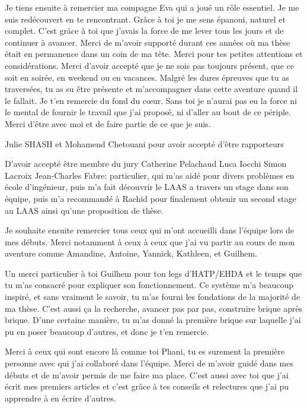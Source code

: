 
Je tiens ensuite à remercier ma compagne Eva qui a joué un rôle essentiel. 
Je me suis redécouvert en te rencontrant. Grâce à toi je me sens épanoui, naturel et complet. C'est grâce à toi que j'avais la force de me lever tous les jours et de continuer à avancer. 
Merci de m'avoir supporté durant ces années où ma thèse était en permanence dans un coin de ma tête.  
Merci pour tes petites attentions et considérations. 
Merci d'avoir accepté que je ne sois pas toujours présent, que ce soit en soirée, en weekend ou en vacances. 
Malgré les dures épreuves que tu as traversées, tu as su être présente et m'accompagner dans cette aventure quand il le fallait.
Je t'en remercie du fond du cœur.
Sans toi je n'aurai pas eu la force ni le mental de fournir le travail que j'ai proposé, ni d'aller au bout de ce périple. 
Merci d'être avec moi et de faire partie de ce que je suis. 



Julie SHASH et Mohamend Chetouani pour avoir accepté d'être rapporteurs

D'avoir accepté être membre du jury
Catherine Pelachaud
Luca Iocchi 
Simon Lacroix
Jean-Charles Fabre: particulier, qui m'as aidé pour divers problèmes en école d'ingénieur, puis m'a fait découvrir le LAAS a travers un stage dans son équipe, puis m'a recommandé à Rachid pour finalement obtenir un second stage au LAAS ainsi qu'une proposition de thèse. 


Je souhaite ensuite remercier tous ceux qui m'ont accueilli dans l'équipe lors de mes débuts. Merci notamment à ceux à ceux que j'ai vu partir au cours de mon aventure comme Amandine, Antoine, Yannick, Kathleen, et Guilhem.

Un merci particulier à toi Guilhem pour ton legs d'HATP/EHDA et le temps que tu m'as consacré pour expliquer son fonctionnement. 
Ce système m'a beaucoup inspiré, et sans vraiment le savoir, tu m'as fourni les fondations de la majorité de ma thèse. C'est aussi ça la recherche, avancer pas par pas, construire brique après brique. D'une certaine manière, tu m'as donné la première brique sur laquelle j'ai pu en poser beaucoup d'autres, et donc je t'en remercie.

Merci à ceux qui sont encore là comme toi Phani, tu es surement la première personne avec qui j'ai collaboré dans l'équipe. Merci de m'avoir guidé dans mes débuts et de m'avoir permis de me faire ma place. C'est aussi avec toi que j'ai écrit mes premiers articles et c'est grâce à tes conseils et relectures que j'ai pu apprendre à en écrire d'autres. 

